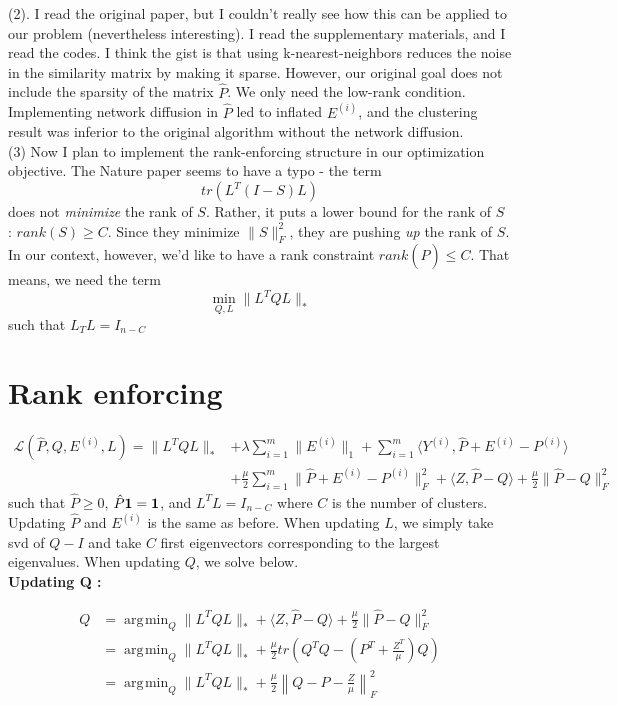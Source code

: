 \documentclass[11pt]{article}
\newcommand{\norm}[1]{\left\lVert#1\right\rVert}
\DeclareMathOperator*{\argmin}{\arg\!\min}
\begin{document}
\noindent (2). I read the original paper, but I couldn't really see how this can be applied to our problem (nevertheless interesting). I read the supplementary materials, and I read the codes. I think the gist is that using k-nearest-neighbors reduces the noise in the similarity matrix by making it sparse. However, our original goal does not include the sparsity of the matrix $\hat{P}$. We only need the low-rank condition. Implementing network diffusion in $\hat{P}$ led to inflated $E^{(i)}$, and the clustering result was inferior to the original algorithm without the network diffusion. \\

\noindent (3) Now I plan to implement the rank-enforcing structure in our optimization objective. The Nature paper seems to have a typo - the term $$tr(L^T (I-S) L) $$ does not \textit{minimize} the rank of $S$. Rather, it puts a lower bound for the rank of $S$ : $rank(S) \geq C$. Since they minimize $\|S\|_F^2$, they are pushing \textit{up} the rank of $S$. In our context, however, we'd like to have a rank constraint $rank(\hat{P}) \leq C$. That means, we need the term 
$$\min_{Q,L} \| L^T Q L\|_*$$ 
such that $L_TL = I_{n-C}$

\section*{Rank enforcing}

\begin{align*}
\mathcal{L}(\hat{P},Q,E^{(i)}, L) = \|L^TQL\|_* &+ \lambda \sum_{i=1}^{m} \|E^{(i)}\|_1 + \sum_{i=1}^{m} \langle Y^{(i)}, \hat{P} + E^{(i)}-P^{(i)} \rangle\\
&+ \frac{\mu}{2}\sum_{i=1}^{m} \| \hat{P} + E^{(i)} - P^{(i)}\|_F^2 + \langle Z, \hat{P}-Q \rangle + \frac{\mu}{2} \|\hat{P}-Q\|_F^2
\end{align*}
such that $\hat{P}\geq 0$, $\hat{P} \bf{1} = \bf{1}$, and $L^TL = I_{n-C}$ where $C$ is the number of clusters.\\

\noindent Updating $\hat{P}$ and $E^{(i)}$ is the same as before. When updating $L$, we simply take svd of $Q-I$ and take $C$ first eigenvectors corresponding to the largest eigenvalues. When updating $Q$, we solve below.\\

\noindent \textbf{Updating Q : }

\begin{align*}
Q &= \argmin_Q \|L^T QL\|_* + \langle Z, \hat{P}-Q \rangle + \frac{\mu}{2} \|\hat{P} - Q\|_F^2\\
&= \argmin_Q \|L^TQL\|_* + \frac{\mu}{2} tr\left(Q^TQ - \left(P^T + \frac{Z^T}{\mu}\right)Q\right)\\
&= \argmin_Q \|L^TQL\|_* + \frac{\mu}{2} \norm{Q-P-\frac{Z}{\mu}}_F^2
\end{align*}
\end{document}
